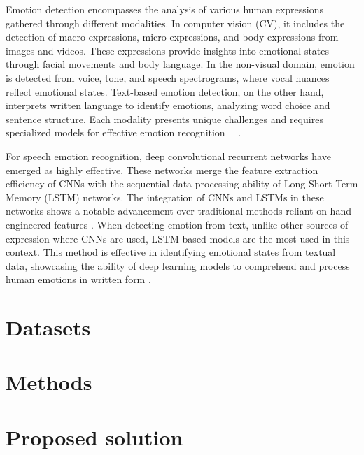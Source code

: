 \documentclass[runningheads]{llncs}
\begin{document}
Emotion detection encompasses the analysis of various human expressions gathered through different modalities. In computer vision (CV), it includes the detection of macro-expressions, micro-expressions, and body expressions from images and videos. These expressions provide insights into emotional states through facial movements and body language. In the non-visual domain, emotion is detected from voice, tone, and speech spectrograms, where vocal nuances reflect emotional states. Text-based emotion detection, on the other hand, interprets written language to identify emotions, analyzing word choice and sentence structure. Each modality presents unique challenges and requires specialized models for effective emotion recognition \cite{Chul2018}~\cite{Trigeorgis2016}~\cite{Karna2020}.

For speech emotion recognition, deep convolutional recurrent networks have emerged as highly effective. These networks merge the feature extraction efficiency of CNNs with the sequential data processing ability of Long Short-Term Memory (LSTM) networks. The integration of CNNs and LSTMs in these networks shows a notable advancement over traditional methods reliant on hand-engineered features \cite{Trigeorgis2016}. When detecting emotion from text, unlike other sources of expression where CNNs are used, LSTM-based models are the most used in this context. This method is effective in identifying emotional states from textual data, showcasing the ability of deep learning models to comprehend and process human emotions in written form \cite{Karna2020}.


\section{Datasets}
\label{sec:datasets}


\section{Methods}
\label{sec:methods}


\section{Proposed solution}
\label{sec:solution}
\end{document}
